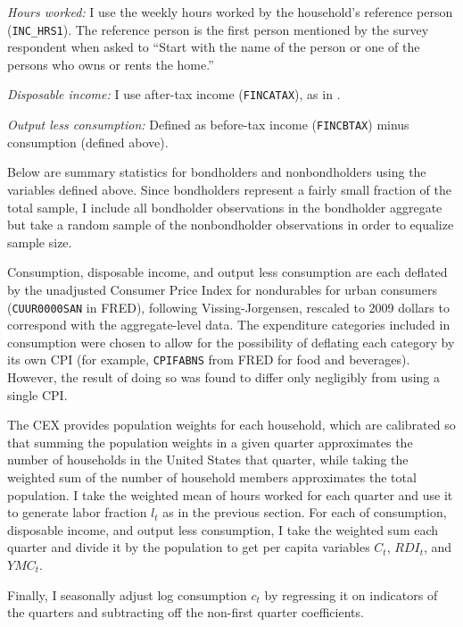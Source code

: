 \textit{Hours worked:} I use the weekly hours worked by the household's reference person (\texttt{INC\_HRS1}). The reference person is the first person mentioned by the survey respondent when asked to ``Start with the name of the person or one of the persons who owns or rents the home.''

\textit{Disposable income:}  I use after-tax income (\texttt{FINCATAX}), as in \cite{krueger15}.

\textit{Output less consumption:} Defined as before-tax income (\texttt{FINCBTAX}) minus consumption (defined above).

Below are summary statistics for bondholders and nonbondholders using the variables defined above. Since bondholders represent a fairly small fraction of the total sample, I include all bondholder observations in the bondholder aggregate but take a random sample of the nonbondholder observations in order to equalize sample size.

\begin{center}
\textbf{\color{red}{SUMMARY STATS TK}}
\end{center}

Consumption, disposable income, and output less consumption are each deflated by the unadjusted Consumer Price Index for nondurables for urban consumers (\texttt{CUUR0000SAN} in FRED), following Vissing-Jorgensen, rescaled to 2009 dollars to correspond with the aggregate-level data. The expenditure categories included in consumption were chosen to allow for the possibility of deflating each category by its own CPI (for example, \texttt{CPIFABNS} from FRED for food and beverages). However, the result of doing so was found to differ only negligibly from using a single CPI.

The CEX provides population weights for each household, which are calibrated so that summing the population weights in a given quarter approximates the number of households in the United States that quarter, while taking the weighted sum of the number of household members approximates the total population. I take the weighted mean of hours worked for each quarter and use it to generate labor fraction $l_t$ as in the previous section. For each of consumption, disposable income, and output less consumption, I take the weighted sum each quarter and divide it by the population to get per capita variables $C_t$, $RDI_t$, and $YMC_t$.

Finally, I seasonally adjust log consumption $c_t$ by regressing it on indicators of the quarters and subtracting off the non-first quarter coefficients.